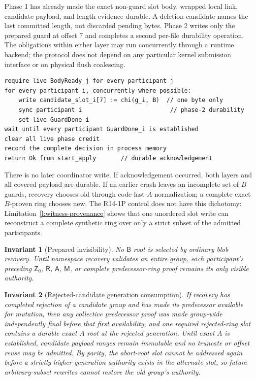 \documentclass[10pt,twocolumn]{article}
\newtheorem{invariant}{Invariant}
\theoremstyle{remark}
\newcommand{\Root}{\mathsf{R}}
\newcommand{\Prepared}{\mathsf{B}}
\newcommand{\Materialized}{\mathsf{M}}
\newcommand{\Abort}{\mathsf{A}}
\newcommand{\Zero}{\mathsf{Z}}
\begin{document}
Phase 1 has already made the exact non-guard slot body, wrapped local link, candidate payload, and
length evidence durable. A deletion candidate names the last committed length, not discarded
pending bytes. Phase 2 writes only the prepared guard at offset 7 and completes a second per-file
durability operation. The obligations within either layer may run concurrently through a runtime
backend; the protocol does not depend on any particular kernel submission interface or on physical
flush coalescing.

\begin{lstlisting}[style=protocol,caption={Establish and acknowledge a decision.}]
require live BodyReady_j for every participant j
for every participant i, concurrently where possible:
    write candidate_slot_i[7] := chi(g_i, B)  // one byte only
    sync participant i                         // phase-2 durability
    set live GuardDone_i
wait until every participant GuardDone_i is established
clear all live phase credit
record the complete decision in process memory
return Ok from start_apply       // durable acknowledgement
\end{lstlisting}

There is no later coordinator write. If acknowledgement occurred, both layers and all covered
payload are durable. If an earlier crash leaves an incomplete set of $B$ guards, recovery chooses
old through code-last $A$ normalization; a complete exact $B$-proven ring chooses new. The
R14-1P control does not have this dichotomy: Limitation~\ref{l:witness-provenance} shows that one
unordered slot write can reconstruct a complete synthetic ring over only a strict subset of the
admitted participants.

\begin{invariant}[Prepared invisibility]\label{i:invisible}
No $\Prepared$ root is selected by ordinary blob recovery. Until namespace recovery validates an
entire group, each participant's preceding $\Zero_0$, $\Root$, $\Abort$, $\Materialized$, or
complete predecessor-ring proof remains its only visible authority.
\end{invariant}

\begin{invariant}[Rejected-candidate generation consumption]\label{i:retirement}
If recovery has completed rejection of a candidate group and has made its predecessor available for mutation,
then any collective predecessor proof was made group-wide independently final before that first
availability, and one required rejected-ring slot contains a durable exact $A$ root at the rejected
generation. Until exact $A$ is established, candidate payload ranges
remain immutable and no truncate or offset reuse may be admitted. By parity, the abort-root slot
cannot be addressed again before a strictly higher-generation authority exists in the alternate
slot, so future arbitrary-subset rewrites cannot restore the old group's authority.
\end{invariant}
\end{document}
